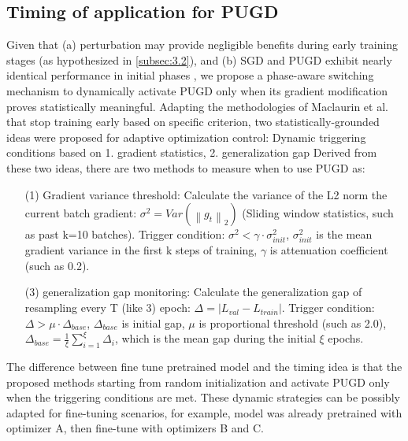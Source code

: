 \documentclass[10pt,twocolumn,letterpaper]{article}
\begin{document}
\subsection{Timing of application for PUGD}
\label{subsec:3.3}
Given that (a) perturbation may provide negligible benefits during early training stages (as hypothesized in \ref{subsec:3.2}), and (b) SGD and PUGD exhibit nearly identical performance in initial phases , we propose a phase-aware switching mechanism to dynamically activate PUGD only when its gradient modification proves statistically meaningful. Adapting the methodologies of Maclaurin et al. \cite{maclaurin2015earlystoppingnonparametricvariational} that stop training early based on specific criterion, two statistically-grounded ideas were proposed for adaptive optimization control: Dynamic triggering conditions based on 1. gradient statistics, 2. generalization gap
Derived from these two ideas, there are two methods to measure when to use PUGD as:
\begin{enumerate}
    \item[(1)] Gradient variance threshold: Calculate the variance of the L2 norm the current batch gradient: $\sigma ^{2} = Var(\left \|g_{t} \right \|_{2})$ (Sliding window statistics, such as past k=10 batches).
	Trigger condition: $\sigma ^{2} < \gamma \cdot  \sigma ^{2}_{init}$, $\sigma ^{2}_{init}$ is the mean gradient variance in the first k steps of training, $\gamma$ is attenuation coefficient (such as 0.2).
	\item[(3)] generalization gap monitoring: Calculate the generalization gap of resampling every T (like 3) epoch: $ \Delta = \left | L_{val} - L_{train} \right |$.
	Trigger condition: $\Delta > \mu \cdot \Delta _{base}$, $\Delta _{base}$ is initial gap, $\mu$ is proportional threshold (such as 2.0), $\Delta _{base} = \frac{1}{\xi} \sum_{i=1}^{\xi} \Delta _{i}$, which is the mean gap during the initial $\xi$ epochs. 
\end{enumerate}

The difference between fine tune pretrained model and the timing idea is that the proposed methods starting from random initialization and activate PUGD only when the triggering conditions are met. These dynamic strategies can be possibly adapted for fine-tuning scenarios, for example, model was already pretrained with optimizer A, then fine-tune with optimizers B and C.
\end{document}
